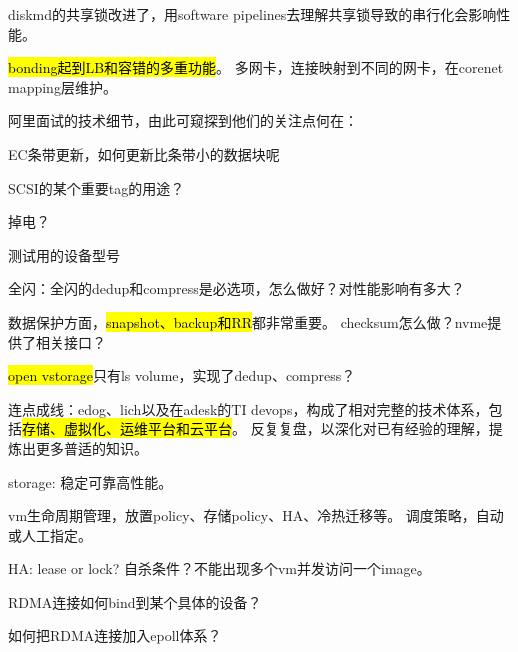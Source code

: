 diskmd的共享锁改进了，用software pipelines去理解共享锁导致的串行化会影响性能。

\hl{bonding起到LB和容错的多重功能}。
多网卡，连接映射到不同的网卡，在corenet mapping层维护。

阿里面试的技术细节，由此可窥探到他们的关注点何在：
\begin{enumbox}
\item EC条带更新，如何更新比条带小的数据块呢
\item SCSI的某个重要tag的用途？
\item 掉电？
\item 测试用的设备型号
\end{enumbox}

\hrulefill

全闪：全闪的dedup和compress是必选项，怎么做好？对性能影响有多大？

数据保护方面，\hl{snapshot、backup和RR}都非常重要。
checksum怎么做？nvme提供了相关接口？

\hl{open vstorage}只有ls volume，实现了dedup、compress？

\hrulefill

连点成线：edog、lich以及在adesk的TI devops，构成了相对完整的技术体系，包括\hl{存储、虚拟化、运维平台和云平台}。
反复复盘，以深化对已有经验的理解，提炼出更多普适的知识。

storage: 稳定可靠高性能。

vm生命周期管理，放置policy、存储policy、HA、冷热迁移等。
调度策略，自动或人工指定。

HA: lease or lock? 自杀条件？不能出现多个vm并发访问一个image。

\hrulefill

RDMA连接如何bind到某个具体的设备？

如何把RDMA连接加入epoll体系？
